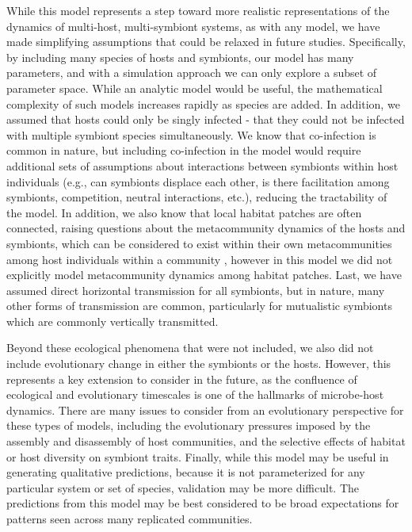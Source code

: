While this model represents a step toward more realistic representations of the dynamics of multi-host, multi-symbiont systems, as with any model, we have made simplifying assumptions that could be relaxed in future studies.
Specifically, by including many species of hosts and symbionts, our model has many parameters, and with a simulation approach we can only explore a subset of parameter space.
While an analytic model would be useful, the mathematical complexity of such models increases rapidly as species are added.
In addition, we assumed that hosts could only be singly infected - that they could not be infected with multiple symbiont species simultaneously.
We know that co-infection is common in nature, but including co-infection in the model would require additional sets of assumptions about interactions between symbionts within host individuals (e.g., can symbionts displace each other, is there facilitation among symbionts, competition, neutral interactions, etc.), reducing the tractability of the model. %
In addition, we also know that local habitat patches are often connected, raising questions about the metacommunity dynamics of the hosts and symbionts, which can be considered to exist within their own metacommunities among host individuals within a community \citep{Mihaljevic2012}, however in this model we did not explicitly model metacommunity dynamics among habitat patches. %
Last, we have assumed direct horizontal transmission for all symbionts, but in nature, many other forms of transmission are common, particularly for mutualistic symbionts which are commonly vertically transmitted.

Beyond these ecological phenomena that were not included, we also did not include evolutionary change in either the symbionts or the hosts.
However, this represents a key extension to consider in the future, as the confluence of ecological and evolutionary timescales is one of the hallmarks of microbe-host dynamics.
There are many issues to consider from an evolutionary perspective for these types of models, including the evolutionary pressures imposed by the assembly and disassembly of host communities, and the selective effects of habitat or host diversity on symbiont traits.
Finally, while this model may be useful in generating qualitative predictions, because it is not parameterized for any particular system or set of species, validation may be more difficult.
The predictions from this model may be best considered to be broad expectations for patterns seen across many replicated communities.

